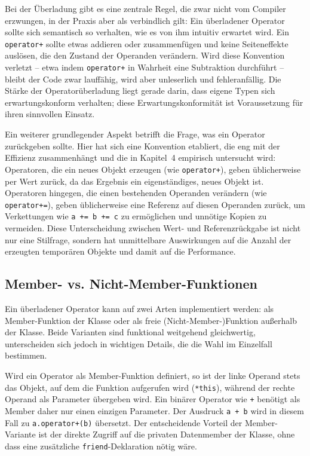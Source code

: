\documentclass[10pt,a4paper]{article}
\begin{document}
Bei der Überladung gibt es eine zentrale Regel, die zwar nicht vom Compiler erzwungen, in der Praxis aber als verbindlich gilt: Ein überladener Operator sollte sich semantisch so verhalten, wie es von ihm intuitiv erwartet wird. Ein \texttt{operator+} sollte etwas addieren oder zusammenfügen und keine Seiteneffekte auslösen, die den Zustand der Operanden verändern. Wird diese Konvention verletzt -- etwa indem \texttt{operator+} in Wahrheit eine Subtraktion durchführt -- bleibt der Code zwar lauffähig, wird aber unleserlich und fehleranfällig. Die Stärke der Operatorüberladung liegt gerade darin, dass eigene Typen sich erwartungskonform verhalten; diese Erwartungskonformität ist Voraussetzung für ihren sinnvollen Einsatz.

Ein weiterer grundlegender Aspekt betrifft die Frage, was ein Operator zurückgeben sollte. Hier hat sich eine Konvention etabliert, die eng mit der Effizienz zusammenhängt und die in Kapitel~4 empirisch untersucht wird: Operatoren, die ein neues Objekt erzeugen (wie \texttt{operator+}), geben üblicherweise per Wert zurück, da das Ergebnis ein eigenständiges, neues Objekt ist. Operatoren hingegen, die einen bestehenden Operanden verändern (wie \texttt{operator+=}), geben üblicherweise eine Referenz auf diesen Operanden zurück, um Verkettungen wie \texttt{a += b += c} zu ermöglichen und unnötige Kopien zu vermeiden. Diese Unterscheidung zwischen Wert- und Referenzrückgabe ist nicht nur eine Stilfrage, sondern hat unmittelbare Auswirkungen auf die Anzahl der erzeugten temporären Objekte und damit auf die Performance.

\subsection{Member- vs. Nicht-Member-Funktionen}

Ein überladener Operator kann auf zwei Arten implementiert werden: als Member-Funktion der Klasse oder als freie (Nicht-Member-)Funktion außerhalb der Klasse. Beide Varianten sind funktional weitgehend gleichwertig, unterscheiden sich jedoch in wichtigen Details, die die Wahl im Einzelfall bestimmen.

Wird ein Operator als Member-Funktion definiert, so ist der linke Operand stets das Objekt, auf dem die Funktion aufgerufen wird (\texttt{*this}), während der rechte Operand als Parameter übergeben wird. Ein binärer Operator wie \texttt{+} benötigt als Member daher nur einen einzigen Parameter. Der Ausdruck \texttt{a + b} wird in diesem Fall zu \texttt{a.operator+(b)} übersetzt. Der entscheidende Vorteil der Member-Variante ist der direkte Zugriff auf die privaten Datenmember der Klasse, ohne dass eine zusätzliche \texttt{friend}-Deklaration nötig wäre.
\end{document}
